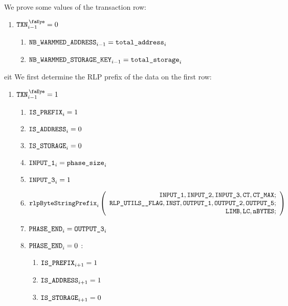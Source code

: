 We prove some values of the transaction row:
\begin{enumerate}[resume]
	\item \If $\isTxn_{i-1}=0$ \Then
	\begin{enumerate}
		\item $\texttt{NB\_WARMMED\_ADDRESS}_{i-1} = \texttt{total\_address}_{i}$
		\item $\texttt{NB\_WARMMED\_STORAGE\_KEY}_{i-1} = \texttt{total\_storage}_{i}$ 
	\end{enumerate}
\end{enumerate}
 eit
We first determine the RLP prefix of the data on the first row:
\begin{enumerate}[resume]
	\item \If $\isTxn_{i-1}=1$ \Then
	\begin{enumerate}
		\item $\texttt{IS\_PREFIX} _{i} = 1$
		\item $\texttt{IS\_ADDRESS}   _{i} = 0$
		\item $\texttt{IS\_STORAGE}    _{i} = 0$
		\item $\texttt{INPUT\_1}_{i} = \texttt{phase\_size}_{i}$
		\item $\texttt{INPUT\_3}_{i} = 1$ 
		\item 
				\[
    			\texttt{rlpByteStringPrefix}_{i}
    			\left(
				\begin{array}{r}
    			\texttt{INPUT\_1},
    			\texttt{INPUT\_2},
    			\texttt{INPUT\_3},
    			\texttt{CT},
    			\texttt{CT\_MAX}; \\
    			\texttt{RLP\_UTILS\_\_FLAG},
    			\texttt{INST},
    			\texttt{OUTPUT\_1},
    			\texttt{OUTPUT\_2},
    			\texttt{OUTPUT\_5}; \\
    			\texttt{LIMB},
    			\texttt{LC},
    			\texttt{nBYTES}; \\
    			\end{array}
				\right)
				\]
		\item $\texttt{PHASE\_END}_{i} = \texttt{OUTPUT\_3}_{i}$
		\item \If $\texttt{PHASE\_END}_{i} =0$ \Then:
			\begin{enumerate}
				\item $\texttt{IS\_PREFIX} _{i+1} = 1$
				\item $\texttt{IS\_ADDRESS}   _{i+1} = 1$
				\item $\texttt{IS\_STORAGE}    _{i+1} = 0$
			\end{enumerate}
	\end{enumerate}
\end{enumerate}

